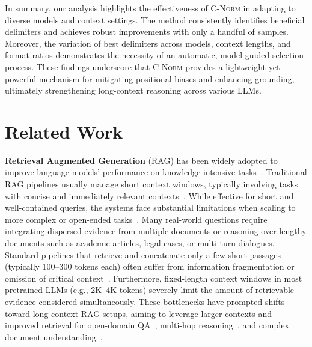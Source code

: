 \documentclass{article} %
\newcommand{\cnorm}{\textsc{C-Norm}}
\begin{document}
In summary, our analysis highlights the effectiveness of \cnorm{} in adapting to diverse models and context settings. The method consistently identifies beneficial delimiters and achieves robust improvements with only a handful of samples. Moreover, the variation of best delimiters across models, context lengths, and format ratios demonstrates the necessity of an automatic, model-guided selection process. These findings underscore that \cnorm{} provides a lightweight yet powerful mechanism for mitigating positional biases and enhancing grounding, ultimately strengthening long-context reasoning across various LLMs.


\section{Related Work}
\textbf{Retrieval Augmented Generation} (RAG) has been widely adopted to improve language models' performance on knowledge-intensive tasks~\citep{borgeaud2022improving,lewis2020retrieval,karpukhin2020dense}. Traditional RAG pipelines usually manage short context windows, typically involving tasks with concise and immediately relevant contexts~\citep{DBLP:conf/nips/LewisPPPKGKLYR020}. While effective for short and well-contained queries, the systems face substantial limitations when scaling to more complex or open-ended tasks~\citep{DBLP:conf/naacl/JeongBCHP24}. Many real-world questions require integrating dispersed evidence from multiple documents or reasoning over lengthy documents such as academic articles, legal cases, or multi-turn dialogues. Standard pipelines that retrieve and concatenate only a few short passages (typically 100–300 tokens each) often suffer from information fragmentation or omission of critical context~\citep{li2024retrieval,DBLP:journals/corr/abs-2404-06654}. Furthermore, fixed-length context windows in most pretrained LLMs (e.g., 2K–4K tokens) severely limit the amount of retrievable evidence considered simultaneously. These bottlenecks have prompted shifts toward long-context RAG setups, aiming to leverage larger contexts and improved retrieval for open-domain QA~\citep{DBLP:conf/acl/AsaiSL0I0HY23,DBLP:conf/acl/LeeCT19,DBLP:journals/corr/abs-2112-09332,li2025towards}, multi-hop reasoning~\citep{DBLP:conf/emnlp/ZhongWMPC23,DBLP:conf/coling/HoNSA20}, and complex document understanding~\citep{DBLP:conf/naacl/DuaWDSS019,DBLP:journals/corr/abs-2410-03227}.
\end{document}
